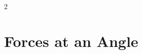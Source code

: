 \documentclass[10pt]{exam}
\def\answer#1{\endnotetext{#1}}
\def\myquestion{\item\stepcounter{endnote}}
\newenvironment{myquestions}{
  \begin{multicols}{2}\begin{enumerate}[resume]
}{
  \end{enumerate}\end{multicols}
}
\begin{document}
\begin{myquestions}

\end{myquestions}


\pagebreak

\section*{Forces at an Angle}
\end{document}
